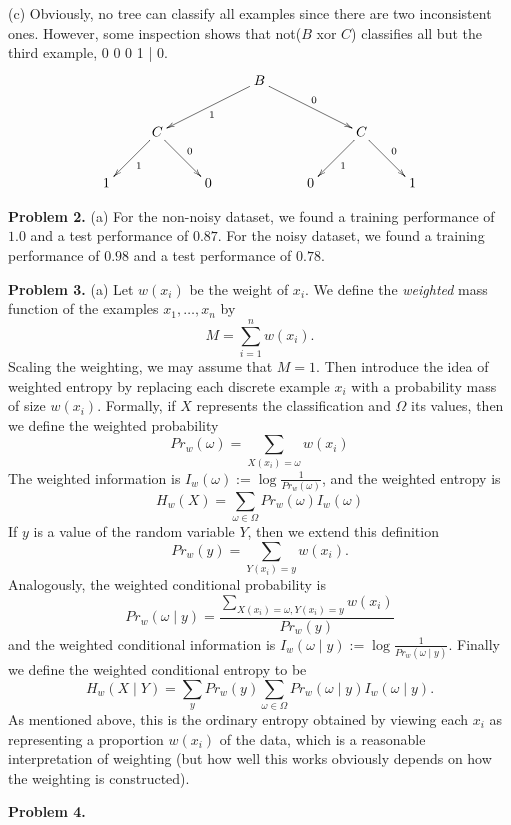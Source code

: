 \documentclass[12pt]{amsart}
\theoremstyle{remark}
\begin{document}
(c) Obviously, no tree can classify all examples since there are two inconsistent ones. However, some inspection shows that not($B$ xor $C$) classifies all but the third example, 0 0 0 1 | 0. 
\[
\xymatrix{
& & & \ar[dll]^1 \ar[drr]^0 B  & & & \\
& C \ar[dl]^1 \ar[dr]^0 & & & & C \ar[dl]^1 \ar[dr]^0 \\
1 & & 0 & & 0 &  & 1
}
\]

\newpage

\noindent \textbf{Problem 2.} (a) For the non-noisy dataset, we found a training performance of $1.0$ and a test performance of $0.87$. For the noisy dataset, we found a training performance of $0.98$ and a test performance of $0.78$. 

\newpage

\noindent \textbf{Problem 3.} (a)  Let $w(x_i)$ be the weight of $x_i$. We define the \emph{weighted} mass function of the examples $x_1, \ldots, x_n$ by 
\[
M = \sum_{i=1}^n w(x_i). 
\]
Scaling the weighting, we may assume that $M=1$. Then introduce the idea of weighted entropy by replacing each discrete example $x_i$ with a probability mass of size $w(x_i)$. Formally, if $X$ represents the classification and $\Omega$ its values, then we define the weighted probability 
\[
Pr_w(\omega) = \sum_{X(x_i) = \omega} w(x_i) 
\]
The weighted information is $I_w(\omega)  := \log \frac{1}{Pr_w(\omega)}$, and the weighted entropy is 
\[
H_w(X) = \sum_{\omega \in \Omega} Pr_w(\omega) I_w(\omega)
\]
If $y$ is a value of the random variable $Y$, then we extend this definition 
\[
Pr_w(y) = \sum_{Y(x_i) = y} w(x_i).
\]
Analogously, the weighted conditional probability is 
\[
Pr_w(\omega \mid y) =\frac{ \sum_{X(x_i) = \omega, Y(x_i) = y} w(x_i)}{Pr_w(y)}
\]
and the weighted conditional information is $I_w(\omega \mid y ) := \log \frac{1}{Pr_w(\omega \mid y)}$. 
Finally we define the weighted conditional entropy to be  
\[
H_w(X \mid Y) = \sum_y Pr_w(y) \sum_{\omega \in \Omega} Pr_w(\omega \mid y) I_w(\omega \mid y).
\]
As mentioned above, this is the ordinary entropy obtained by viewing each $x_i$ as representing a proportion $w(x_i)$ of the data, which is a reasonable interpretation of weighting (but how well this works obviously depends on how the weighting is constructed). 
\newpage

\noindent \textbf{Problem 4.} 
\end{document}
